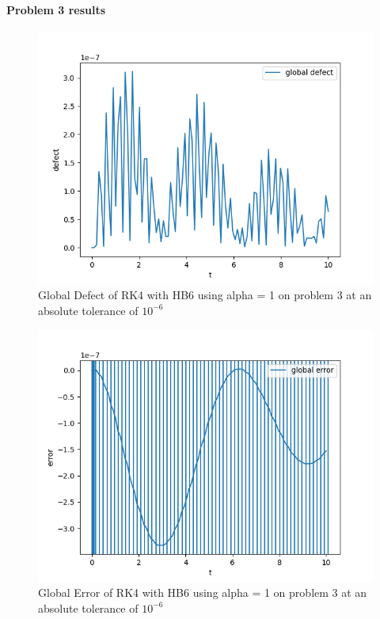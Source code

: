 \documentclass{article}
\begin{document}
\paragraph{Problem 3 results}


\begin{figure}[H]
\centering
\includegraphics[width=0.7\linewidth]{./figures/static_alpha_rk4_with_hb6_p3_global_defect}
\caption{Global Defect of RK4 with HB6 using alpha = 1 on problem 3 at an absolute tolerance of $10^{-6}$}
\label{fig:static_alpha_rk4_with_hb6_p3_global_defect}
\end{figure}

\begin{figure}[H]
\centering
\includegraphics[width=0.7\linewidth]{./figures/static_alpha_rk4_with_hb6_p3_global_error}
\caption{Global Error of RK4 with HB6 using alpha = 1 on problem 3 at an absolute tolerance of $10^{-6}$}
\label{fig:static_alpha_rk4_with_hb6_p3_global_error}
\end{figure}
\end{document}
